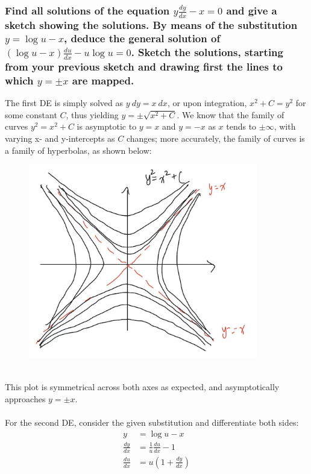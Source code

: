 \documentclass{article}
\begin{document}
\subsubsection*{Find all solutions of the equation $y \frac{dy}{dx} - x = 0$ and give a sketch showing the solutions. By means of the substitution $y=\log u - x$, deduce the general solution of $(\log u -x)\frac{du}{dx} - u\log u =0$. Sketch the solutions, starting from your previous sketch and drawing first the lines to which $y = \pm x$ are mapped.}
The first DE is simply solved as $y\ dy = x\ dx$, or upon integration, $x^2 + C = y^2$ for some constant $C$, thus yielding $y = \pm \sqrt{x^2 + C}$. We know that the family of curves $y^2 =  x^2 +C$ is asymptotic to $y = x$ and $y = -x$ as $x$ tends to $\pm\infty$, with varying x- and y-intercepts as $C$ changes; more accurately, the family of curves is a family of hyperbolas, as shown below:
\begin{figure}[h]
    \centering
    \includegraphics[width=10cm]{DE-ch2-7-1.jpg}
\end{figure}
\\
This plot is symmetrical across both axes as expected, and asymptotically approaches $y=\pm x$.
\\
\\
For the second DE, consider the given substitution and differentiate both sides:
\begin{equation*}
    \begin{aligned}
        y &= \log u - x \\
        \frac{dy}{dx} &= \frac{1}{u}\frac{du}{dx} - 1 \\
        \frac{du}{dx} &= u(1+\frac{dy}{dx}) 
    \end{aligned}
\end{equation*}
\end{document}

